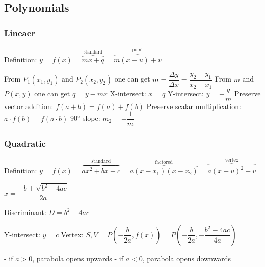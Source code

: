 \subsection{Polynomials}

\subsubsection{Lineaer}

Definition: $y = f(x) = 
\overbrace{mx+q}^\text{standard} =
\overbrace{m(x-u) + v}^\text{point}$

From $P_1(x_1,y_1)$ and $P_2(x_2, y_2)$ one can get $m = \dfrac{\Delta y}{\Delta x} = \dfrac{y_2-y_1}{x_2-x_1}$
From $m$ and $P(x, y)$ one can get $q = y-mx$
X-intersect: $x = q$
Y-intersect: $y = -\dfrac{q}{m}$
Preserve vector addition: $f(a + b) = f(a) + f(b)$
Preserve scalar multiplication: $a\cdot f(b) = f(a\cdot b)$
90° slope: $m_2 = -\dfrac{1}{m}$

\subsubsection{Quadratic}

Definition: $y = f(x) = 
\overbrace{ax^2+bx+c}^\text{standard}=
\overbrace{a(x-x_1)(x-x_2)}^\text{factored}=
\overbrace{a(x-u)^2+v}^\text{vertex}$

$x = \dfrac{-b\pm\sqrt{b^2-4ac}}{2a}$

Discriminant: $D = b^2-4ac$

Y-intersect: $y = c$
Vertex: $S, V = P\left(-\dfrac{b}{2a}, f(x)\right) = P\left(-\dfrac{b}{2a}, -\dfrac{b^2-4ac}{4a}\right)$

- if $a > 0$, parabola opens upwards
- if $a < 0$, parabola opens downwards